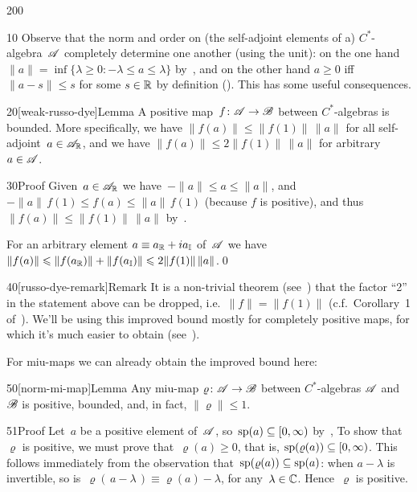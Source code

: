 \begin{parsec}{200}%
\begin{point}{10}%
Observe that the norm and order on 
(the self-adjoint elements of a) $C^*$-algebra~$\mathscr{A}$
completely determine one another (using the unit):
on the one hand
$\|a\|=\inf\{\lambda\geq 0\colon -\lambda\leq a\leq \lambda\}$
by~,
and on the other hand
$a\geq 0$ iff $\|a-s\|\leq s$ for some $s\in\mathbb{R}$
by definition ().
This has some useful consequences.
\end{point}
\begin{point}{20}[weak-russo-dye]{Lemma}%
A positive map~$f\colon \mathscr{A}\to\mathscr{B}$
between $C^*$-algebras
is bounded.
More specifically,
we have
$\|f(a)\|\leq \|f(1)\|\,\|a\|$
for all self-adjoint~$a\in\mathscr{A}_{\mathbb{R}}$,
and we have $\|f(a)\|\leq 2\|f(1)\|\,\|a\|$
for arbitrary $a\in \mathscr{A}$.
\begin{point}{30}{Proof}%
Given~$a\in\mathscr{A}_{\mathbb{R}}$
we have~$-\|a\|\leq a \leq \|a\|$,
and $-\|a\|\,f(1)\leq f(a)\leq \|a\|\,f(1)$
(because $f$ is positive),
and thus~$\|f(a)\|\leq \|f(1)\|\,\|a\|$
by~.

For an arbitrary element $a\equiv a_{\mathbb{R}}+ia_{\mathbb{I}}$
of~$\mathscr{A}$
we have 
$\|f(a)\|\leqslant \|f(a_{\mathbb{R}})\|+\|f(a_{\mathbb{I}})\|\leqslant 2\|f(1)\|\,\|a\|$.\qed
\end{point}
\begin{point}{40}[russo-dye-remark]{Remark}%
It is a non-trivial theorem (see~)
that the factor ``2'' in the statement above
can be dropped, i.e.~$\|f\|=\|f(1)\|$
(c.f.~Corollary~1 of~\cite{russodye}).
We'll be using this improved bound mostly
for completely positive maps,
for which it's much easier to obtain (see~).

For miu-maps we can already obtain the improved bound here:
\end{point}
\end{point}
\begin{point}{50}[norm-mi-map]{Lemma}%
Any miu-map $\varrho\colon\mathscr{A}\to\mathscr{B}$ 
    between $C^*$-algebras $\mathscr{A}$ and~$\mathscr{B}$
is positive, bounded,
    and, in fact, $\|\varrho\|\leq 1$.
\begin{point}{51}{Proof}%
Let~$a$ be a positive element of~$\mathscr{A}$,
    so~$\mathrm{sp}(a)\subseteq[0,\infty)$ by~,
To show that~$\varrho$ is positive,
we must prove that~$\varrho(a)\geq 0$,
that is, $\mathrm{sp}(\varrho(a))\subseteq[0,\infty)$.
This follows immediately
from the observation that~$\mathrm{sp}(\varrho(a))\subseteq \mathrm{sp}(a)$:
 when $a-\lambda$ is invertible,
so is~$\varrho(\,a-\lambda\,)\equiv\varrho(a)-\lambda$,
for any~$\lambda\in \mathbb{C}$.
Hence~$\varrho$ is positive.


\end{point}
\end{point}
\end{parsec}
